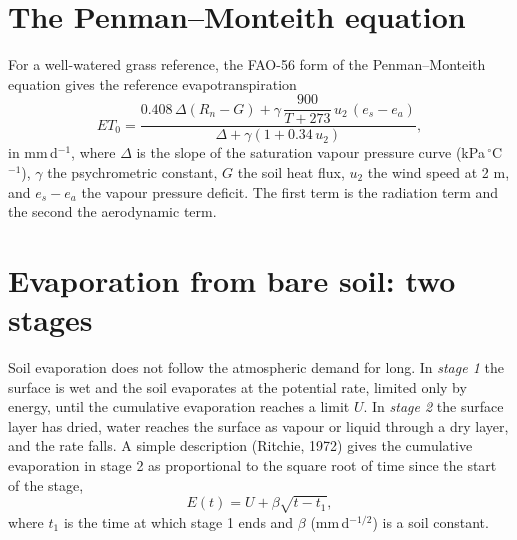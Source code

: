 \section{The Penman--Monteith equation}
For a well-watered grass reference, the FAO-56 form of the Penman--Monteith equation gives the reference evapotranspiration
\begin{equation}\label{eq:pm}\boxed{ET_0=\frac{0.408\,\Delta(R_n-G)+\gamma\,\dfrac{900}{T+273}\,u_2\,(e_s-e_a)}{\Delta+\gamma(1+0.34\,u_2)},}\end{equation}
in mm\,d$^{-1}$, where $\Delta$ is the slope of the saturation vapour pressure curve (kPa\,$^\circ$C$^{-1}$), $\gamma$ the psychrometric constant, $G$ the soil heat flux, $u_2$ the wind speed at 2 m, and $e_s-e_a$ the vapour pressure deficit. The first term is the radiation term and the second the aerodynamic term.



\section{Evaporation from bare soil: two stages}
Soil evaporation does not follow the atmospheric demand for long. In \emph{stage 1} the surface is wet and the soil evaporates at the potential rate, limited only by energy, until the cumulative evaporation reaches a limit $U$. In \emph{stage 2} the surface layer has dried, water reaches the surface as vapour or liquid through a dry layer, and the rate falls. A simple description (Ritchie, 1972) gives the cumulative evaporation in stage 2 as proportional to the square root of time since the start of the stage,
\begin{equation}\label{eq:stage2}\boxed{E(t)=U+\beta\sqrt{t-t_1},}\end{equation}
where $t_1$ is the time at which stage 1 ends and $\beta$ (mm\,d$^{-1/2}$) is a soil constant.


